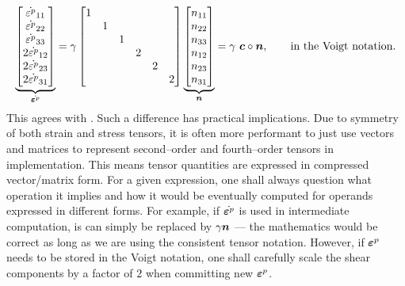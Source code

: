 \begin{gather}
    \underbrace{\begin{bmatrix}
            \dot{\varepsilon^p}_{11}  \\
            \dot{\varepsilon^p}_{22}  \\
            \dot{\varepsilon^p}_{33}  \\
            2\dot{\varepsilon^p}_{12} \\
            2\dot{\varepsilon^p}_{23} \\
            2\dot{\varepsilon^p}_{31}
        \end{bmatrix}}_{\dot{\bm{\varepsilon}^p}}
    =
    \gamma\begin{bmatrix}
        1 &   &   &   &   &   \\
          & 1 &   &   &   &   \\
          &   & 1 &   &   &   \\
          &   &   & 2 &   &   \\
          &   &   &   & 2 &   \\
          &   &   &   &   & 2
    \end{bmatrix}
    \underbrace{
        \begin{bmatrix}
            n_{11} \\
            n_{22} \\
            n_{33} \\
            n_{12} \\
            n_{23} \\
            n_{31}
        \end{bmatrix}}_{\bm{n}}=\gamma~\bm{c}\circ\bm{n},\qquad\text{in the Voigt notation.}
\end{gather}
This agrees with .
Such a difference has practical implications.
Due to symmetry of both strain and stress tensors, it is often more performant to just use vectors and matrices to represent second--order and fourth--order tensors in implementation.
This means tensor quantities are expressed in compressed vector/matrix form.
For a given expression, one shall always question what operation it implies and how it would be eventually computed for operands expressed in different forms.
For example, if $\dot{\bm{\varepsilon}^p}$ is used in intermediate computation, is can simply be replaced by $\gamma\bm{n}$ --- the mathematics would be correct as long as we are using the consistent tensor notation.
However, if $\bm{\varepsilon}^p$ needs to be stored in the Voigt notation, one shall carefully scale the shear components by a factor of $2$ when committing new $\bm{\varepsilon}^p$.

